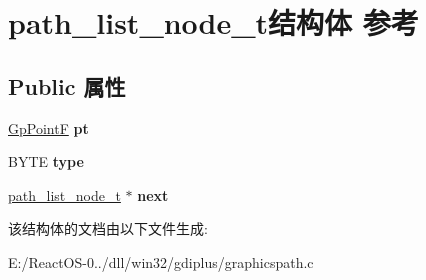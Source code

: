 \hypertarget{structpath__list__node__t}{}\section{path\+\_\+list\+\_\+node\+\_\+t结构体 参考}
\label{structpath__list__node__t}
\subsection*{Public 属性}
\begin{DoxyCompactItemize}
\item 
\mbox{\label{structpath__list__node__t_a83e91d600db0547df058079ac07d2f3b}} 
\hyperlink{struct_point_f}{Gp\+PointF} {\bfseries pt}
\item 
\mbox{\label{structpath__list__node__t_a261ba5086d39a152d451c79281c03bd1}} 
B\+Y\+TE {\bfseries type}
\item 
\mbox{\label{structpath__list__node__t_ac2dc08a0f5d8d976e6430c6a1602b2fa}} 
\hyperlink{structpath__list__node__t}{path\+\_\+list\+\_\+node\+\_\+t} $\ast$ {\bfseries next}
\end{DoxyCompactItemize}


该结构体的文档由以下文件生成\+:\begin{DoxyCompactItemize}
\item 
E\+:/\+React\+O\+S-\/0../dll/win32/gdiplus/graphicspath.\+c\end{DoxyCompactItemize}
